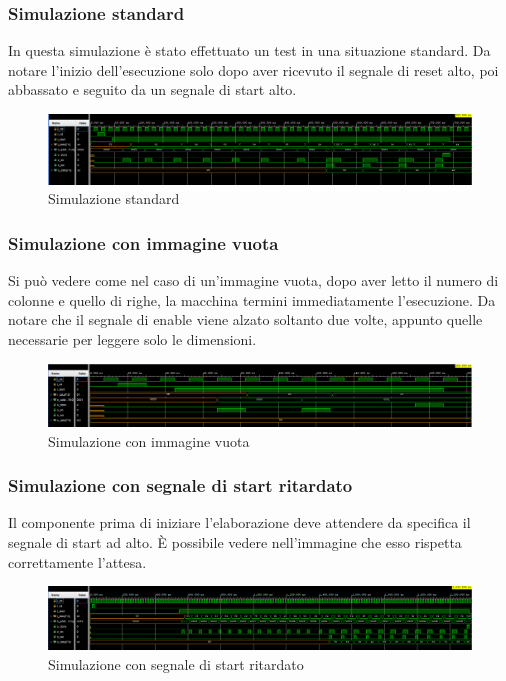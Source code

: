 \documentclass{article}
\begin{document}
\subsubsection{Simulazione standard}
In questa simulazione è stato effettuato un test in una situazione standard. Da notare l'inizio dell'esecuzione solo dopo aver ricevuto il segnale di reset alto, poi abbassato e seguito da un segnale di start alto.
\begin{figure}[h]
    \includegraphics[width=\textwidth]{test-standard.png}
    \centering
    \caption{Simulazione standard}
\end{figure}

\subsubsection{Simulazione con immagine vuota}
Si può vedere come nel caso di un'immagine vuota, dopo aver letto il numero di colonne e quello di righe, la macchina termini immediatamente l'esecuzione. Da notare che il segnale di enable viene alzato soltanto due volte, appunto quelle necessarie per leggere solo le dimensioni.
\begin{figure}[h]
    \includegraphics[width=\textwidth]{test-empty-image.png}
    \centering
    \caption{Simulazione con immagine vuota}
\end{figure}

\subsubsection{Simulazione con segnale di start ritardato}
Il componente prima di iniziare l'elaborazione deve attendere da specifica il segnale di start ad alto. È possibile vedere nell'immagine che esso rispetta correttamente l'attesa.
\begin{figure}[h]
    \includegraphics[width=\textwidth]{test-delayed-start.png}
    \centering
    \caption{Simulazione con segnale di start ritardato}
\end{figure}
\end{document}
